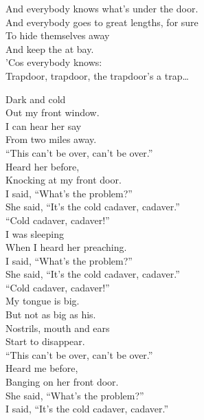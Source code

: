 And everybody knows what's under the door. \\
And everybody goes to great lengths, for sure \\
To hide themselves away \\
And keep the  at bay. \\
'Cos everybody knows: \\

Trapdoor, trapdoor, the trapdoor's a trap… \\




Dark and cold \\
Out my front window. \\
I can hear her say \\
From two miles away. \\

``This can't be over, can't be over.'' \\

Heard her before, \\
Knocking at my front door. \\
I said, ``What's the problem?'' \\
She said, ``It's the cold cadaver, cadaver.'' \\

``Cold cadaver, cadaver!'' \\

I was sleeping \\
When I heard her preaching. \\
I said, ``What's the problem?'' \\
She said, ``It's the cold cadaver, cadaver.'' \\

``Cold cadaver, cadaver!'' \\

My tongue is big. \\
But not as big as his. \\
Nostrils, mouth and ears \\
Start to disappear. \\

``This can't be over, can't be over.'' \\
Heard me before, \\
Banging on her front door. \\
She said, ``What's the problem?'' \\
I said, ``It's the cold cadaver, cadaver.'' \\

